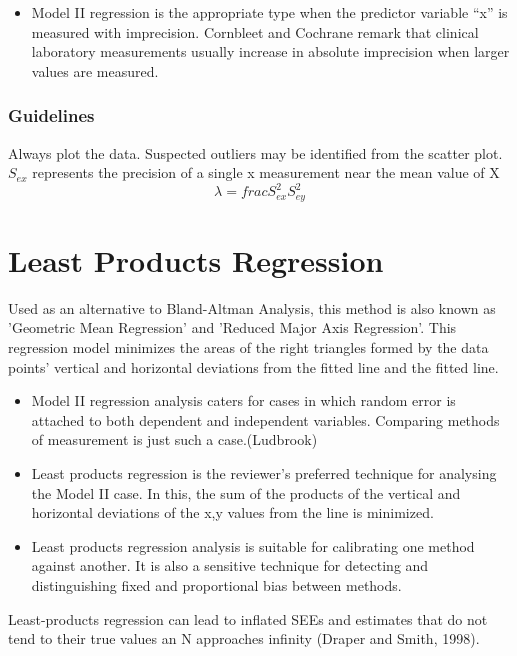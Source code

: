 \documentclass[12pt, a4paper]{report}
\theoremstyle{plain}
\theoremstyle{definition}
\theoremstyle{remark}
\begin{document}
\begin{itemize}
\item Model II regression is the appropriate type when the predictor variable “x” is measured with imprecision.
	Cornbleet and Cochrane remark that clinical laboratory measurements usually increase in absolute imprecision when larger values are measured. %
\end{itemize}

\subsubsection*{Guidelines}
Always plot the data. Suspected outliers may be identified from the scatter plot.
$S_{ex}$  represents the precision of a single x measurement near the mean value of X
\[\lambda = frac{S^2_{ex}}{S^2_{ey}}\]



\section{Least Products Regression}
Used as an alternative to Bland-Altman Analysis, this method is also known as 'Geometric Mean Regression' and 'Reduced Major Axis Regression'. This regression model minimizes the areas of the right triangles formed by the data points' vertical and horizontal deviations from the fitted line and the fitted line.

\begin{itemize}
	\item Model II regression analysis caters for cases in which random error is attached to both dependent and independent variables. Comparing methods of measurement is just such a case.(Ludbrook)
	
	\item Least products regression is the reviewer's preferred technique for analysing the Model II case. In this, the sum of the products of the vertical and horizontal deviations of the x,y values from the line is minimized.
	
	\item Least products regression analysis is suitable for calibrating one method against another. It is also a sensitive technique for detecting and distinguishing fixed and proportional bias between
	methods.
\end{itemize}

Least-products regression can lead to inflated SEEs and estimates that do not tend to their true values an N approaches infinity (Draper and Smith, 1998).
\end{document}
